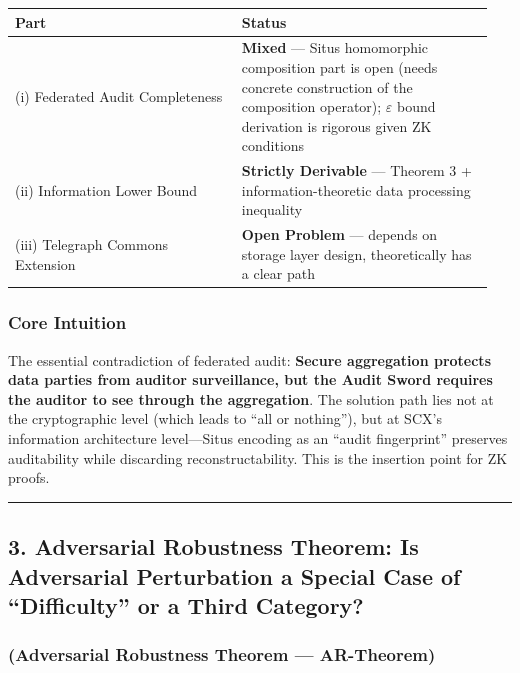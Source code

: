 \documentclass[
  12pt,
]{article}
\begin{document}
\begin{longtable}[]{@{}p{0.45\linewidth}p{0.50\linewidth}@{}}
\toprule\noalign{}
\begin{minipage}[b]{\linewidth}\raggedright
Part
\end{minipage} & \begin{minipage}[b]{\linewidth}\raggedright
Status
\end{minipage} \\
\midrule\noalign{}
\endhead
\bottomrule\noalign{}
\endlastfoot
(i) Federated Audit Completeness & \textbf{Mixed} --- Situs homomorphic composition part is open (needs concrete construction of the composition operator); $\varepsilon$ bound derivation is rigorous given ZK conditions \\
(ii) Information Lower Bound & \textbf{Strictly Derivable} --- Theorem 3 + information-theoretic data processing inequality \\
(iii) Telegraph Commons Extension & \textbf{Open Problem} --- depends on storage layer design, theoretically has a clear path \\
\end{longtable}

\subsubsection{Core Intuition}\label{core-intuition-fa}

The essential contradiction of federated audit: \textbf{Secure aggregation protects data parties from auditor surveillance, but the Audit Sword requires the auditor to see through the aggregation}. The solution path lies not at the cryptographic level (which leads to ``all or nothing''), but at SCX's information architecture level---Situs encoding as an ``audit fingerprint'' preserves auditability while discarding reconstructability. This is the insertion point for ZK proofs.

\begin{center}\rule{0.5\linewidth}{0.5pt}\end{center}

\subsection{3. Adversarial Robustness Theorem: Is Adversarial Perturbation a Special Case of ``Difficulty'' or a Third Category?}\label{adversarial-robustness-theorem}

\subsubsection{(Adversarial Robustness Theorem --- AR-Theorem)}\label{ar-theorem-next}
\end{document}
